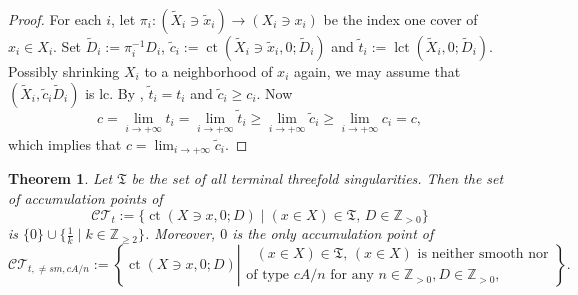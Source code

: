 \documentclass[11pt]{amsart}
\numberwithin{equation}{section}
\newcommand{\Zz}{\mathbb{Z}}
\newcommand{\lct}{\operatorname{lct}}
\newcommand{\ct}{\operatorname{ct}}
\newtheorem{thm}{Theorem}[section]
\theoremstyle{definition}
\theoremstyle{definition}
\begin{document}
\begin{proof}
For each $i$, let $\pi_i: (\widetilde{X}_i\ni \tilde{x}_i)\to (X_i\ni x_i)$ be the index one cover of $x_i\in X_i$. Set $\widetilde{D}_i:=\pi_i^{-1}D_i$, $\widetilde{c}_i:=\ct(\widetilde{X}_i\ni \widetilde{x}_i,0;\widetilde{D}_i)$ and $\widetilde{t}_i:=\lct(\widetilde{X}_i,0;\widetilde{D}_i)$. Possibly shrinking $X_i$ to a neighborhood of $x_i$ again, we may assume that $(\tilde{X}_i,\tilde{c}_i\tilde{D}_i)$ is lc. By \cite[Proposition~5.20]{KM98}, $\widetilde{t}_i=t_i$ and $\widetilde{c}_i\geq c_i$. Now $$c=\lim_{i\to +\infty} t_i=\lim_{i\to +\infty} \widetilde{t}_i\geq \lim_{i\to +\infty} \widetilde{c}_i\geq \lim_{i\to +\infty} c_i=c,$$ which implies that $c=\lim_{i\to +\infty} \widetilde{c}_i$.
\end{proof}




\begin{thm}\label{thm: explicite accumulation points of canonical thresholds}
Let $\mathfrak{T}$ be the set of all terminal threefold singularities. Then the set of accumulation points of $$\mathcal{CT}_t:=\{\ct(X\ni x,0;D)\mid (x\in X)\in \mathfrak{T},\, D\in \Zz_{> 0}\}$$ is $\{0\}\cup\{\frac{1}{k}\mid k\in \Zz_{\geq 2}\}$. Moreover, $0$ is the only accumulation point of
      \[
		\mathcal{CT}_{t,\neq{ sm,cA/n}}:=\left\{\ct(X\ni x,0;D)\left| \begin{array}{l} \text{ $(x\in X)\in \mathfrak{T}$, $(x\in X)$ is neither smooth nor}\\ 
		\text{of type $cA/n$ for any $n\in\Zz_{>0}$}, D\in \Zz_{>0}, 
		\end{array}\right.
		\right\}.
     \]
\end{thm}
\end{document}
